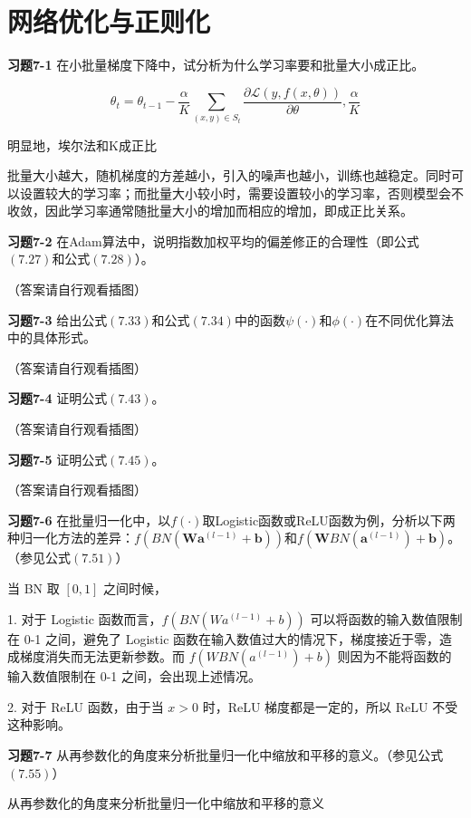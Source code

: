 \section{网络优化与正则化}

\noindent\textbf{习题7-1} 在小批量梯度下降中，试分析为什么学习率要和批量大小成正比。

\[
\theta_t = \theta_{t-1} - \frac{\alpha}{K} \sum_{(x,y)\in S_t} \frac{\partial \mathcal{L}(y, f(x, \theta))}{\partial \theta}, \frac{\alpha}{K}
\]

明显地，埃尔法和K成正比

批量大小越大，随机梯度的方差越小，引入的噪声也越小，训练也越稳定。同时可以设置较大的学习率；而批量大小较小时，需要设置较小的学习率，否则模型会不收敛，因此学习率通常随批量大小的增加而相应的增加，即成正比关系。

\noindent\textbf{习题7-2} 在Adam算法中，说明指数加权平均的偏差修正的合理性（即公式$(7.27)$和公式$(7.28)$）。

（答案请自行观看插图）

\noindent\textbf{习题7-3} 给出公式$(7.33)$和公式$(7.34)$中的函数$\psi(\cdot)$和$\phi(\cdot)$在不同优化算法中的具体形式。

（答案请自行观看插图）

\noindent\textbf{习题7-4} 证明公式$(7.43)$。

（答案请自行观看插图）

\noindent\textbf{习题7-5} 证明公式$(7.45)$。

（答案请自行观看插图）

\noindent\textbf{习题7-6} 在批量归一化中，以$f(\cdot)$取Logistic函数或ReLU函数为例，分析以下两种归一化方法的差异：$f(BN(\boldsymbol{W}\boldsymbol{a}^{(l-1)} + \boldsymbol{b}))$和$f(\boldsymbol{W}BN(\boldsymbol{a}^{(l-1)}) + \boldsymbol{b})$。（参见公式$(7.51)$）

当 BN 取 $[0,1]$ 之间时候，

1. 对于 Logistic 函数而言，$f(BN(Wa^{(l-1)} + b))$ 可以将函数的输入数值限制在 0-1 之间，避免了 Logistic 函数在输入数值过大的情况下，梯度接近于零，造成梯度消失而无法更新参数。而 $f(WBN(a^{(l-1)}) + b)$ 则因为不能将函数的输入数值限制在 0-1 之间，会出现上述情况。

2. 对于 ReLU 函数，由于当 $x>0$ 时，ReLU 梯度都是一定的，所以 ReLU 不受这种影响。

\noindent\textbf{习题7-7} 从再参数化的角度来分析批量归一化中缩放和平移的意义。（参见公式$(7.55)$）

从再参数化的角度来分析批量归一化中缩放和平移的意义

